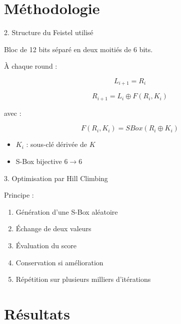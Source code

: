 \documentclass[10pt]{beamer}
\begin{document}
\section{Méthodologie}

\begin{frame}{2. Structure du Feistel utilisé}

Bloc de 12 bits séparé en deux moitiés de 6 bits.

\vspace{0.3cm}

À chaque round :

\[
L_{i+1}=R_i
\]

\[
R_{i+1}=L_i \oplus F(R_i,K_i)
\]

avec :

\[
F(R_i,K_i)=SBox(R_i \oplus K_i)
\]

\vspace{0.3cm}

\begin{itemize}
    \item $K_i$ : sous-clé dérivée de $K$
    \item S-Box bijective $6 \rightarrow 6$
\end{itemize}

\end{frame}


\begin{frame}{3. Optimisation par Hill Climbing}

Principe :

\begin{enumerate}
    \item Génération d'une S-Box aléatoire
    \item Échange de deux valeurs
    \item Évaluation du score
    \item Conservation si amélioration
    \item Répétition sur plusieurs milliers d'itérations
\end{enumerate}

\vspace{0.4cm}


\end{frame}

\section{Résultats}
\end{document}
